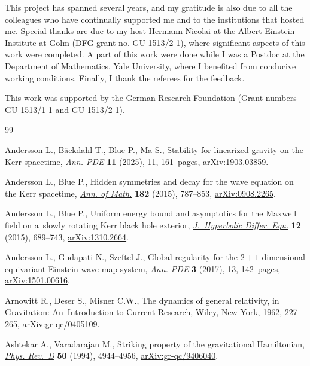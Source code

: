 \documentclass[pdftex]{sigma}
\numberwithin{equation}{section}
\begin{document}
This project has spanned several years, and my gratitude is also due to all the colleagues who have continually supported me and to the institutions that hosted me. Special thanks are due to my host Hermann Nicolai at the Albert Einstein Institute at Golm (DFG grant no. GU 1513/2-1), where significant aspects of this work were completed. A part of this work were done while I was a Postdoc at the Department of Mathematics, Yale University, where I benefited from conducive working conditions. Finally, I thank the referees for the feedback.

This work was supported by the German Research Foundation (Grant numbers GU 1513/1-1 and GU 1513/2-1).

\begin{thebibliography}{99}
\footnotesize\itemsep=0pt

Andersson L., B\"ackdahl T., Blue P., Ma S., Stability for linearized gravity
 on the {K}err spacetime,
 \href{https://doi.org/10.1007/s40818-024-00193-w}{\textit{Ann. PDE}}
 \textbf{11} (2025), 11, 161~pages,
 \href{http://arxiv.org/abs/1903.03859}{arXiv:1903.03859}.

Andersson L., Blue P., Hidden symmetries and decay for the wave equation on the
 {K}err spacetime,
 \href{https://doi.org/10.4007/annals.2015.182.3.1}{\textit{Ann. of Math.}}
 \textbf{182} (2015), 787--853,
 \href{http://arxiv.org/abs/0908.2265}{arXiv:0908.2265}.

Andersson L., Blue P., Uniform energy bound and asymptotics for the {M}axwell
 field on a~slowly rotating {K}err black hole exterior,
 \href{https://doi.org/10.1142/S0219891615500204}{\textit{J.~Hyperbolic
 Differ. Equ.}} \textbf{12} (2015), 689--743,
 \href{http://arxiv.org/abs/1310.2664}{arXiv:1310.2664}.

Andersson L., Gudapati N., Szeftel J., Global regularity for the {$2+1$}
 dimensional equivariant {E}instein-wave map system,
 \href{https://doi.org/10.1007/s40818-017-0030-z}{\textit{Ann. PDE}}
 \textbf{3} (2017), 13, 142~pages,
 \href{http://arxiv.org/abs/1501.00616}{arXiv:1501.00616}.

Arnowitt R., Deser S., Misner C.W., The dynamics of general relativity, in
 Gravitation: {A}n~Introduction to Current Research, Wiley, New York, 1962,
 227--265, \href{http://arxiv.org/abs/gr-qc/0405109}{arXiv:gr-qc/0405109}.

Ashtekar A., Varadarajan M., Striking property of the gravitational
 {H}amiltonian, \href{https://doi.org/10.1103/PhysRevD.50.4944}{\textit{Phys.
 Rev.~D}} \textbf{50} (1994), 4944--4956,
 \href{http://arxiv.org/abs/gr-qc/9406040}{arXiv:gr-qc/9406040}.


\end{thebibliography}
\end{document}

